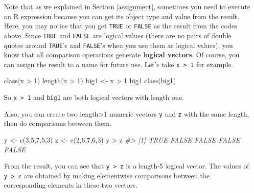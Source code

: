 \documentclass[
]{book}
\newenvironment{Shaded}{\begin{snugshade}}{\end{snugshade}}
\newcommand{\CommentTok}[1]{\textcolor[rgb]{0.56,0.35,0.01}{\textit{#1}}}
\newcommand{\DecValTok}[1]{\textcolor[rgb]{0.00,0.00,0.81}{#1}}
\newcommand{\FunctionTok}[1]{\textcolor[rgb]{0.00,0.00,0.00}{#1}}
\newcommand{\NormalTok}[1]{#1}
\newcommand{\OtherTok}[1]{\textcolor[rgb]{0.56,0.35,0.01}{#1}}
\newcommand{\SpecialCharTok}[1]{\textcolor[rgb]{0.00,0.00,0.00}{#1}}
\begin{document}
Note that as we explained in Section \ref{assignment}, sometimes you need to execute an R expression because you can get its object type and value from the result. Here, you may notice that you get \texttt{TRUE} or \texttt{FALSE} as the result from the codes above. Since \texttt{TRUE} and \texttt{FALSE} are logical values (there are no pairs of double quotes around \texttt{TRUE}'s and \texttt{FALSE}'s when you use them as logical values), you know that all comparison operations generate \textbf{logical vectors}. Of course, you can assign the result to a name for future use. Let's take \texttt{x\ \textgreater{}\ 1} for example.

\begin{Shaded}
\begin{Highlighting}[]
\FunctionTok{class}\NormalTok{(x }\SpecialCharTok{\textgreater{}} \DecValTok{1}\NormalTok{)}
\FunctionTok{length}\NormalTok{(x }\SpecialCharTok{\textgreater{}} \DecValTok{1}\NormalTok{)}
\NormalTok{big1 }\OtherTok{\textless{}{-}}\NormalTok{ x }\SpecialCharTok{\textgreater{}} \DecValTok{1}
\NormalTok{big1}
\FunctionTok{class}\NormalTok{(big1)}
\end{Highlighting}
\end{Shaded}

So \texttt{x\ \textgreater{}\ 1} and \texttt{big1} are both logical vectors with length one.

Also, you can create two length\textgreater1 numeric vectors \texttt{y} and \texttt{z} with the same length, then do comparisons between them.

\begin{Shaded}
\begin{Highlighting}[]
\NormalTok{y }\OtherTok{\textless{}{-}} \FunctionTok{c}\NormalTok{(}\DecValTok{3}\NormalTok{,}\DecValTok{5}\NormalTok{,}\DecValTok{7}\NormalTok{,}\DecValTok{5}\NormalTok{,}\DecValTok{3}\NormalTok{)}
\NormalTok{z }\OtherTok{\textless{}{-}} \FunctionTok{c}\NormalTok{(}\DecValTok{2}\NormalTok{,}\DecValTok{6}\NormalTok{,}\DecValTok{7}\NormalTok{,}\DecValTok{6}\NormalTok{,}\DecValTok{3}\NormalTok{)}
\NormalTok{y }\SpecialCharTok{\textgreater{}}\NormalTok{ z}
\CommentTok{\#\textgreater{} [1]  TRUE FALSE FALSE FALSE FALSE}
\end{Highlighting}
\end{Shaded}

From the result, you can see that \texttt{y\ \textgreater{}\ z} is a length-5 logical vector. The values of \texttt{y\ \textgreater{}\ z} are obtained by making elementwise comparisons between the corresponding elements in these two vectors.
\end{document}
